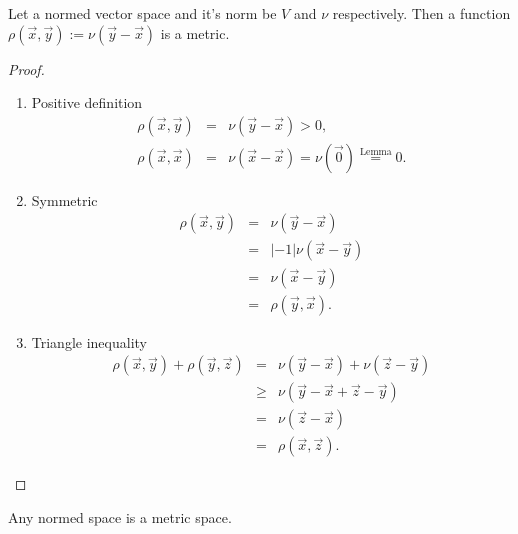 \begin{proposition}{}{}
    Let a normed vector space and it's norm be $V$ and $\nu$ respectively. Then a function $\rho\left(\vec{x},\vec{y}\right) := \nu\left(\vec{y} - \vec{x}\right)$ is a metric. 
\end{proposition}
\begin{proof}
    \begin{enumerate}
        \item Positive definition
        \begin{eqnarray}
                \displaystyle\rho\left(\vec{x}, \vec{y}\right) &=& \nu\left(\vec{y} - \vec{x}\right) > 0, \nonumber\\
                \displaystyle \rho\left(\vec{x}, \vec{x}\right) &=& \nu\left(\vec{x} - \vec{x}\right) = \nu\left(\vec{0}\right) \stackrel{\text{Lemma}}{=} 0.\nonumber
        \end{eqnarray}
        \item Symmetric
        \begin{eqnarray}
            \rho\left(\vec{x}, \vec{y}\right) 
            &=& \nu\left(\vec{y} - \vec{x}\right) \nonumber\\
            &=& |-1|\nu\left(\vec{x} - \vec{y}\right) \nonumber\\
            &=& \nu\left(\vec{x} - \vec{y}\right) \nonumber\\
            &=& \rho\left(\vec{y}, \vec{x}\right) \nonumber.
        \end{eqnarray}
        \item Triangle inequality
        \begin{eqnarray}
                \rho\left(\vec{x}, \vec{y}\right) + \rho\left(\vec{y}, \vec{z}\right) 
                &=&  
                \nu\left(\vec{y} - \vec{x}\right) + \nu\left(\vec{z} - \vec{y}\right)  \nonumber\\
                &\geq&  \nonumber
                \nu\left(\vec{y} - \vec{x} + \vec{z} -\vec{y} \right) \nonumber\\
                &=&  \nu\left(\vec{z} - \vec{x}\right) \nonumber\\
                &=&  \rho\left(\vec{x}, \vec{z}\right) \nonumber.
        \end{eqnarray}
    \end{enumerate}
\end{proof}
\begin{note}{}{}
    Any normed space is a metric space.
\end{note}

